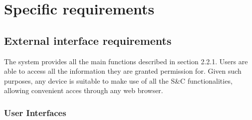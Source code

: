 \chapter{Specific requirements}

\section{External interface requirements}

The system provides all the main functions described in section 2.2.1.
Users are able to access all the information they are granted permission for.
Given such purposes, any device is suitable to make use of all the S\&C functionalities, allowing convenient acces through any web browser.

\subsection{User Interfaces}

